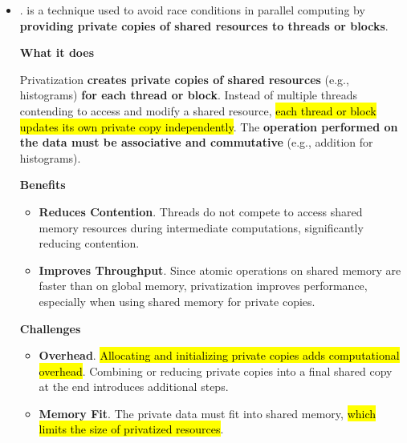 \begin{itemize}
    \newpage

    \item {}.  is a technique used to avoid race conditions in parallel computing by \textbf{providing private copies of shared resources to threads or blocks}.

    \begin{flushleft}
        \textcolor{Green3}{ \textbf{What it does}}
    \end{flushleft}
    Privatization \textbf{creates private copies of shared resources} (e.g., histograms) \textbf{for each thread or block}. Instead of multiple threads contending to access and modify a shared resource, \hl{each thread or block updates its own private copy independently}. The \textbf{operation performed on the data must be associative and commutative} (e.g., addition for histograms).

    \begin{flushleft}
        \textcolor{Green3}{ \textbf{Benefits}}
    \end{flushleft}
    \begin{itemize}[label=\textcolor{Green3}{}]
        \item \textcolor{Green3}{\textbf{Reduces Contention}}. Threads do not compete to access shared memory resources during intermediate computations, significantly reducing contention.
        \item \textcolor{Green3}{\textbf{Improves Throughput}}. Since atomic operations on shared memory are faster than on global memory, privatization improves performance, especially when using shared memory for private copies.
    \end{itemize}

    \begin{flushleft}
        \textcolor{Red2}{ \textbf{Challenges}}
    \end{flushleft}
    \begin{itemize}
        \item \textcolor{Red2}{\textbf{Overhead}}. \hl{Allocating and initializing private copies adds computational overhead}. Combining or reducing private copies into a final shared copy at the end introduces additional steps.
        \item \textcolor{Red2}{\textbf{Memory Fit}}. The private data must fit into shared memory, \hl{which limits the size of privatized resources}.
    \end{itemize}


\end{itemize}
